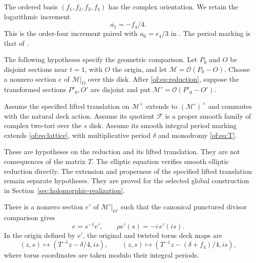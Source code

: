 The ordered basis $(f_1,f_2,f_3,f_4)$ has the complex orientation.
We retain the logarithmic increment
\begin{equation}\label{of:eq:increment}
                         a_1=-f_4/4.
\end{equation}
This is the order-four increment paired with $a_0=e_4/3$ in
\cite[p.~12]{Engel}. The period marking is that of
\cite[Theorem~5.1, pp.~12--13]{Engel}.

The following hypotheses specify the geometric comparison.
Let $P_0$ and $O$ be disjoint sections near $t=1$, with $O$ the origin,
and let $\mathcal M=\mathcal O(P_0-O)$.
Choose a nonzero section $e$ of $\mathcal M|_O$ over this disk.
After \eqref{of:eq:reduction}, suppose the transformed sections $P'_0,O'$
are disjoint and put $\mathcal M'=\mathcal O(P'_0-O')$.

Assume the specified lifted translation on $\mathcal M^\times$ extends to
$(\mathcal M')^\times$ and commutes with the natural deck action.
Assume its quotient $\mathcal F$ is a proper smooth family of complex
two-tori over the $s$ disk.
Assume its smooth integral period marking extends \eqref{of:eq:lattice},
with multiplicative period $\delta$ and monodromy \eqref{of:eq:T}.

These are hypotheses on the reduction and its lifted translation.
They are not consequences of the matrix $T$.
The elliptic equation verifies smooth elliptic reduction directly.
The extension and properness of the specified lifted translation remain
separate hypotheses.
They are proved for the selected global construction in
Section~\ref{sec:holomorphic-realization}.

\begin{lemma}\label{of:lem:conormal}
There is a nonzero section $e'$ of $\mathcal M'|_{O'}$ such that the
canonical punctured divisor comparison gives
\begin{equation}\label{of:eq:conormal}
                     e=s^{-1}e',\qquad \rho e'(s)=-i\,e'(is).
\end{equation}
In the origin defined by $e'$, the original and twisted torus deck maps are
\begin{equation}\label{of:eq:affine}
 (z,s)\mapsto(T^{-1}z-\delta/4,is),\qquad
 (z,s)\mapsto(T^{-1}z-(\delta+f_4)/4,is),
\end{equation}
where torus coordinates are taken modulo their integral periods.
\end{lemma}

